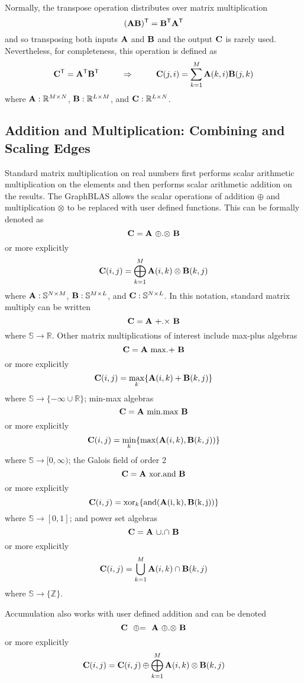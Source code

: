 Normally, the transpose operation distributes over matrix multiplication
$$
({\bf A} {\bf B})^{\sf T} ={\bf B}^{\sf T} {\bf A}^{\sf T}
$$
and so transposing both inputs ${\bf A}$ and ${\bf B}$ and the output ${\bf C}$ is rarely used.  Nevertheless, for completeness, this operation is defined as
$$
   {\bf C}^{\sf T} = {\bf A}^{\sf T} {\bf B}^{\sf T} ~~~~~~~~ \Rightarrow ~~~~~~~~ {\bf C}(j,i) = \sum_{k=1}^M {\bf A}(k,i) {\bf B}(j,k)
$$
where ${\bf A}: \mathbb{R}^{M \times N}$, ${\bf B}: \mathbb{R}^{L \times M}$, and ${\bf C}: \mathbb{R}^{L \times N}$.

\subsection{Addition and Multiplication: Combining and Scaling Edges}
  Standard matrix multiplication on real numbers first performs scalar arithmetic multiplication on the elements and then performs scalar arithmetic addition on the results.  The GraphBLAS allows the scalar operations of addition $\oplus$ and multiplication $\otimes$ to be replaced with user defined functions.  This can be formally denoted as
$$
   {\bf C} = {\bf A} ~ {\oplus}.{\otimes} ~ {\bf B}
$$
or more explicitly
$$
   {\bf C}(i,j) = \bigoplus_{k=1}^M {\bf A}(i,k) \otimes {\bf B}(k,j)
$$
where ${\bf A}: \mathbb{S}^{N \times M}$,  ${\bf B}: \mathbb{S}^{M \times L}$, and ${\bf C}: \mathbb{S}^{N \times L}$.  In this notation, standard matrix multiply can be written
$$
   {\bf C} = {\bf A} ~ {+}.{\times} ~ {\bf B}
$$
where $\mathbb{S} \rightarrow \mathbb{R}$. Other matrix multiplications of interest include max-plus algebras
$$
   {\bf C} = {\bf A} ~ {\max}.{+} ~ {\bf B}
$$
or more explicitly
$$
   {\bf C}(i,j) = \max_k \{{\bf A}(i,k) + {\bf B}(k,j)\}
$$
where $\mathbb{S} \rightarrow \{-\infty \cup \mathbb{R}\}$; min-max algebras
$$
   {\bf C} = {\bf A} ~ {\min}.{\max} ~ {\bf B}
$$
or more explicitly
$$
   {\bf C}(i,j) = \min_k \{\max({\bf A}(i,k),{\bf B}(k,j))\}
$$
where $\mathbb{S} \rightarrow [0,\infty)$; the Galois field of order 2
$$
   {\bf C} = {\bf A} ~ {\rm xor}.{\rm and} ~ {\bf B}
$$
or more explicitly
$$
   {\bf C}(i,j) = {\rm xor}_k \{\rm and({\bf A}(i,k),{\bf B}(k,j))\}
$$
where $\mathbb{S} \rightarrow [0,1]$; and power set algebras
$$
   {\bf C} = {\bf A} ~ {\cup}.{\cap} ~ {\bf B}
$$
or more explicitly
$$
   {\bf C}(i,j) = \bigcup_{k=1}^M {\bf A}(i,k) \cap {\bf B}(k,j)
$$
where $\mathbb{S} \rightarrow \{\mathbb{Z}\}$.

  Accumulation also works with user defined addition and can be denoted
$$
   {\bf C} ~~ {\oplus}{=} ~~ {\bf A} ~ {\oplus}.{\otimes} ~ {\bf B}
$$
or more explicitly
$$
   {\bf C}(i,j) = {\bf C}(i,j) \oplus \bigoplus_{k=1}^M {\bf A}(i,k) \otimes {\bf B}(k,j)
$$


